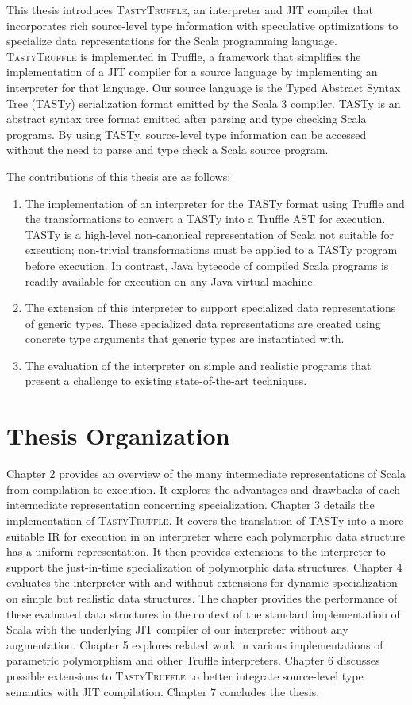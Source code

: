 This thesis introduces \textsc{TastyTruffle}, an interpreter and JIT compiler that incorporates rich source-level type information with speculative optimizations to specialize data representations for the Scala programming language.
\textsc{TastyTruffle} is implemented in Truffle, a framework that simplifies the implementation of a JIT compiler for a source language by implementing an interpreter for that language. 
Our source language is the Typed Abstract Syntax Tree (TASTy) serialization format emitted by the Scala 3 compiler.
TASTy is an abstract syntax tree format emitted after parsing and type checking Scala programs.
By using TASTy, source-level type information can be accessed without the need to parse and type check a Scala source program.

The contributions of this thesis are as follows: 
\begin{enumerate}
	\item The implementation of an interpreter for the TASTy format using Truffle and the transformations to convert a TASTy into a Truffle AST for execution. TASTy is a high-level non-canonical representation of Scala not suitable for execution; non-trivial transformations must be applied to a TASTy program before execution.
	In contrast, Java bytecode of compiled Scala programs is readily available for execution on any Java virtual machine.
	\item The extension of this interpreter to support specialized data representations of generic types.
	These specialized data representations are created using concrete type arguments that generic types are instantiated with.
	\item The evaluation of the interpreter on simple and realistic programs that present a challenge to existing state-of-the-art techniques.
\end{enumerate}

\newpage

\section{Thesis Organization}

Chapter 2 provides an overview of the many intermediate representations of Scala from compilation to execution.
It explores the advantages and drawbacks of each intermediate representation concerning specialization.
Chapter 3 details the implementation of \textsc{TastyTruffle}.
It covers the translation of TASTy into a more suitable IR for execution in an interpreter where each polymorphic data structure has a uniform representation.
It then provides extensions to the interpreter to support the just-in-time specialization of polymorphic data structures.
Chapter 4 evaluates the interpreter with and without extensions for dynamic specialization on simple but realistic data structures.
The chapter provides the performance of these evaluated data structures in the context of the standard implementation of Scala with the underlying JIT compiler of our interpreter without any augmentation.
Chapter 5 explores related work in various implementations of parametric polymorphism and other Truffle interpreters.
Chapter 6 discusses possible extensions to \textsc{TastyTruffle} to better integrate source-level type semantics with JIT compilation.
Chapter 7 concludes the thesis.